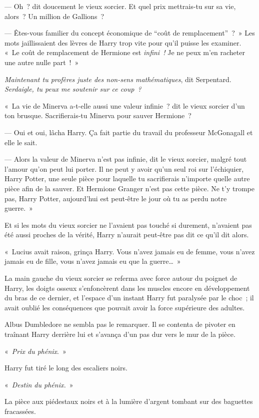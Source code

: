 --- Oh~? dit doucement le vieux sorcier.
Et quel prix mettrais-tu sur sa vie, alors~?
Un million de Gallions~?

--- Êtes-vous familier du concept économique de “coût de remplacement”~?~»
Les mots jaillissaient des lèvres de Harry trop vite pour qu'il puisse les examiner.
«~Le coût de remplacement de Hermione est \emph{infini~!} Je ne peux m'en racheter une autre nulle part~!~»

\emph{Maintenant tu profères juste des non-sens mathématiques}, dit Serpentard.
\emph{Serdaigle, tu peux me soutenir sur ce coup~?}

«~La vie de Minerva a-t-elle aussi une valeur infinie~? dit le vieux sorcier d'un ton brusque.
Sacrifierais-tu Minerva pour sauver Hermione~?

--- Oui et oui, lâcha Harry.
Ça fait partie du travail du professeur McGonagall et elle le sait.

--- Alors la valeur de Minerva n'est pas infinie, dit le vieux sorcier, malgré tout l'amour qu'on peut lui porter.
Il ne peut y avoir qu'un seul roi sur l'échiquier, Harry Potter, une seule pièce pour laquelle tu sacrifierais n'importe quelle autre pièce afin de la sauver.
Et Hermione Granger n'est pas cette pièce.
Ne t'y trompe pas, Harry Potter, aujourd'hui est peut-être le jour où tu as perdu notre guerre.~»

Et si les mots du vieux sorcier ne l'avaient pas touché si durement, n'avaient pas été aussi proches de la vérité, Harry n'aurait peut-être pas dit ce qu'il dit alors.

«~Lucius avait raison, grinça Harry.
Vous n'avez jamais eu de femme, vous n'avez jamais eu de fille, vous n'avez jamais eu que la guerre…~»

La main gauche du vieux sorcier se referma avec force autour du poignet de Harry, les doigts osseux s'enfoncèrent dans les muscles encore en développement du bras de ce dernier, et l'espace d'un instant Harry fut paralysée par le choc~; il avait oublié les conséquences que pouvait avoir la force supérieure des adultes.

Albus Dumbledore ne sembla pas le remarquer.
Il se contenta de pivoter en traînant Harry derrière lui et s'avança d'un pas dur vers le mur de la pièce.

«~\emph{Prix du phénix}.~»

Harry fut tiré le long des escaliers noirs.

«~\emph{Destin du phénix.}~»

La pièce aux piédestaux noirs et à la lumière d'argent tombant sur des baguettes fracassées.

